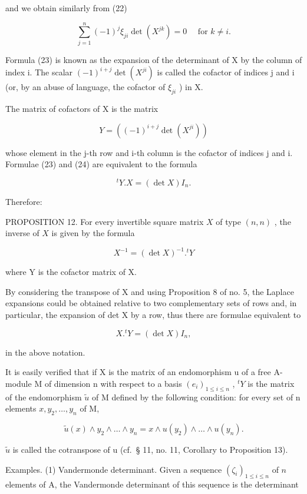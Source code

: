 and we obtain similarly from (22)

\[
\sum_ {j = 1} ^ {n} (- 1) ^ {j} \xi_ {j i} \det (X ^ {j k}) = 0 \quad \text { for } k \neq i.\tag{24}
\]

Formula (23) is known as the expansion of the determinant of X by the column of index i. The scalar \((-1)^{i+j}\det(X^{ji})\) is called the cofactor of indices j and i (or, by an abuse of language, the cofactor of \(\xi_{ji}\) ) in X.

The matrix of cofactors of X is the matrix

\[
Y = ((- 1) ^ {i + j} \det (X ^ {j i}))\tag{25}
\]

whose element in the j-th row and i-th column is the cofactor of indices j and i. Formulae (23) and (24) are equivalent to the formula

\[
{ } ^ { t } Y . X = ( \operatorname * { d e t } X ) I _ { n } .\tag{26}
\]

Therefore:

PROPOSITION 12. For every invertible square matrix \(X\) of type \((n, n)\) , the inverse of \(X\) is given by the formula

\[
X ^ {- 1} = (\det X) ^ {- 1}. ^ {t} Y\tag{27}
\]

where Y is the cofactor matrix of X.

By considering the transpose of X and using Proposition 8 of no. 5, the Laplace expansions could be obtained relative to two complementary sets of rows and, in particular, the expansion of det X by a row, thus there are formulae equivalent to

\[
X. ^ {t} Y = (\det X) I _ {n},\tag{28}
\]

in the above notation.

It is easily verified that if X is the matrix of an endomorphism u of a free A-module M of dimension n with respect to a basis \((e_{i})_{1\leq i\leq n}\) , \(^{t}Y\) is the matrix of the endomorphism \(\tilde{u}\) of M defined by the following condition: for every set of n elements \(x, y_{2}, \ldots, y_{n}\) of M,

\[
\tilde {u} (x) \wedge y _ {2} \wedge \dots \wedge y _ {n} = x \wedge u (y _ {2}) \wedge \dots \wedge u (y _ {n}).
\]

\(\tilde{u}\) is called the cotranspose of u (cf.~§ 11, no. 11, Corollary to Proposition 13).

Examples. (1) Vandermonde determinant. Given a sequence \((\zeta_{i})_{1\leqslant i\leqslant n}\) of \(n\) elements of A, the Vandermonde determinant of this sequence is the determinant

